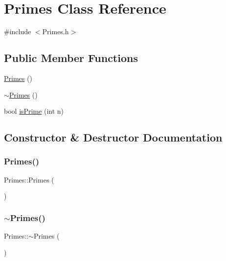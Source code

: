 \hypertarget{classPrimes}{}\section{Primes Class Reference}
\label{classPrimes}


{\ttfamily \#include $<$Primes.\+h$>$}

\subsection*{Public Member Functions}
\begin{DoxyCompactItemize}
\item 
\hyperlink{classPrimes_a70cd05a47aebde487578eb445127d01e}{Primes} ()
\item 
\hyperlink{classPrimes_a3e6c9ae9222cc4cfac3e734ec1f23ecb}{$\sim$\+Primes} ()
\item 
bool \hyperlink{classPrimes_aee78865d4c4afb3f7d30f0209ac0a56d}{is\+Prime} (int n)
\end{DoxyCompactItemize}


\subsection{Constructor \& Destructor Documentation}
\mbox{\label{classPrimes_a70cd05a47aebde487578eb445127d01e}} 
\subsubsection{\texorpdfstring{Primes()}{Primes()}}
{\footnotesize\ttfamily Primes\+::\+Primes (\begin{DoxyParamCaption}{ }\end{DoxyParamCaption})\hspace{0.3cm}{\ttfamily [inline]}}

\mbox{\label{classPrimes_a3e6c9ae9222cc4cfac3e734ec1f23ecb}} 
\subsubsection{\texorpdfstring{$\sim$\+Primes()}{~Primes()}}
{\footnotesize\ttfamily Primes\+::$\sim$\+Primes (\begin{DoxyParamCaption}{ }\end{DoxyParamCaption})\hspace{0.3cm}{\ttfamily [default]}}



